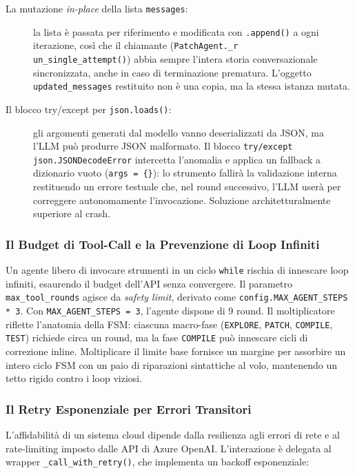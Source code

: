 \begin{description}
    \item[La mutazione \textit{in-place} della lista \texttt{messages}:] la lista è passata per riferimento e
    modificata con \texttt{.append()} a ogni iterazione, così che il chiamante
    (\texttt{PatchAgent.\_r\\un\_single\_attempt()}) abbia sempre l'intera storia conversazionale sincronizzata, anche
    in caso di terminazione prematura. L'oggetto \texttt{updated\_messages} restituito non è una copia, ma la stessa
    istanza mutata.

    \item[Il blocco try/except per \texttt{json.loads()}:] gli argomenti generati dal modello vanno deserializzati
    da JSON, ma l'LLM può produrre JSON malformato. Il blocco \texttt{try/except json.JSONDecodeError} intercetta
    l'anomalia e applica un fallback a dizionario vuoto (\texttt{args = \{\}}): lo strumento fallirà la validazione
    interna restituendo un errore testuale che, nel round successivo, l'LLM userà per correggere autonomamente
    l'invocazione. Soluzione architetturalmente superiore al crash.
\end{description}

\subsubsection{Il Budget di Tool-Call e la Prevenzione di Loop Infiniti}
\label{subsubsec:3.4.3.2}
Un agente libero di invocare strumenti in un ciclo \texttt{while} rischia di innescare loop infiniti, esaurendo il
budget dell'API senza convergere. Il parametro \texttt{max\_tool\_rounds} agisce da \textit{safety limit}, derivato
come \texttt{config.MAX\_AGENT\_STEPS * 3}. Con \texttt{MAX\_AGENT\_STEPS = 3}, l'agente dispone di 9 round. Il
moltiplicatore riflette l'anatomia della FSM: ciascuna macro-fase (\texttt{EXPLORE}, \texttt{PATCH}, \texttt{COMPILE},
\texttt{TEST}) richiede circa un round, ma la fase \texttt{COMPILE} può innescare cicli di correzione inline.
Moltiplicare il limite base fornisce un margine per assorbire un intero ciclo FSM con un paio di riparazioni
sintattiche al volo, mantenendo un tetto rigido contro i loop viziosi.

\subsubsection{Il Retry Esponenziale per Errori Transitori}
\label{subsubsec:3.4.3.3}
L'affidabilità di un sistema cloud dipende dalla resilienza agli errori di rete e al rate-limiting imposto dalle
API di Azure OpenAI. L'interazione è delegata al wrapper \texttt{\_call\_with\_retry()}, che implementa un backoff
esponenziale:

